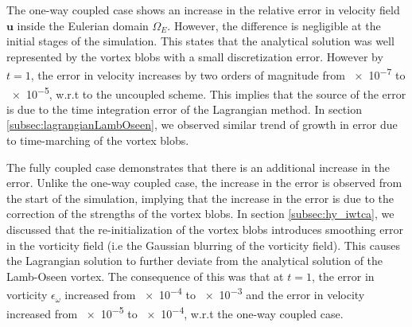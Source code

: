 The one-way coupled case shows an increase in the relative error in velocity field $\mathbf{u}$ inside the Eulerian domain $\Omega_E$. However, the difference is negligible at the initial stages of the simulation. This states that the analytical solution was well represented by the vortex blobs with a small discretization error. However by $t=1$, the error in velocity increases by two orders of magnitude from \num{e-7} to \num{e-5}, w.r.t to the uncoupled scheme. This implies that the source of the error is due to the time integration error of the Lagrangian method. In section \ref{subsec:lagrangianLambOseen}, we observed similar trend of growth in error due to time-marching of the vortex blobs.

The fully coupled case demonstrates that there is an additional increase in the error. Unlike the one-way coupled case, the increase in the error is observed from the start of the simulation, implying that the increase in the error is due to the correction of the strengths of the vortex blobs. In section \ref{subsec:hy_iwtca}, we discussed that the re-initialization of the vortex blobs introduces smoothing error in the vorticity field (i.e the Gaussian blurring of the vorticity field). This causes the Lagrangian solution to further deviate from the analytical solution of the Lamb-Oseen vortex. The consequence of this was that at $t=1$, the error in vorticity $\epsilon_{\omega}$ increased from \num{e-4} to \num{e-3} and the error in velocity increased from \num{e-5} to \num{e-4}, w.r.t the one-way coupled case.

